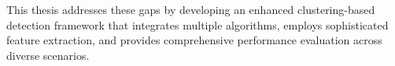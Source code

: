 This thesis addresses these gaps by developing an enhanced clustering-based detection framework that integrates multiple algorithms, employs sophisticated feature extraction, and provides comprehensive performance evaluation across diverse scenarios.

